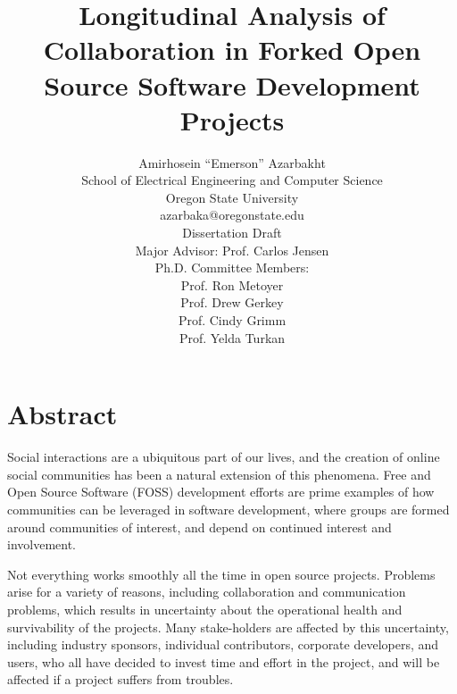 \documentclass[12pt]{report}
\begin{document}
\title{Longitudinal Analysis of Collaboration in Forked Open Source Software Development Projects}

\author{Amirhosein ``Emerson'' Azarbakht\\
School of Electrical Engineering and Computer Science\\
Oregon State University\\
\vspace{5mm} %
azarbaka@oregonstate.edu\\
\vspace{5mm} %
Dissertation Draft\\
Major Advisor: Prof. Carlos Jensen\\
Ph.D. Committee Members:\\
Prof. Ron Metoyer\\
Prof. Drew Gerkey\\
Prof. Cindy Grimm\\
Prof. Yelda Turkan\\
}

\maketitle

\doublespacing

\tableofcontents

\thispagestyle{empty}
\listoffigures
\listoftables

\pagebreak

\section{Abstract}

Social interactions are a ubiquitous part of our lives, and the creation of online social communities has been a natural extension of this phenomena. Free and Open Source Software (FOSS) development efforts are prime examples of how communities can be leveraged in software development, where groups are formed around communities of interest, and depend on continued interest and involvement.

Not everything works smoothly all the time in open source projects. Problems arise for a variety of reasons, including collaboration and communication problems, which results in uncertainty about the operational health and survivability of the projects. Many stake-holders are affected by this uncertainty, including industry sponsors, individual contributors, corporate developers, and users, who all have decided to invest time and effort in the project, and will be affected if a project suffers from troubles.
\end{document}
